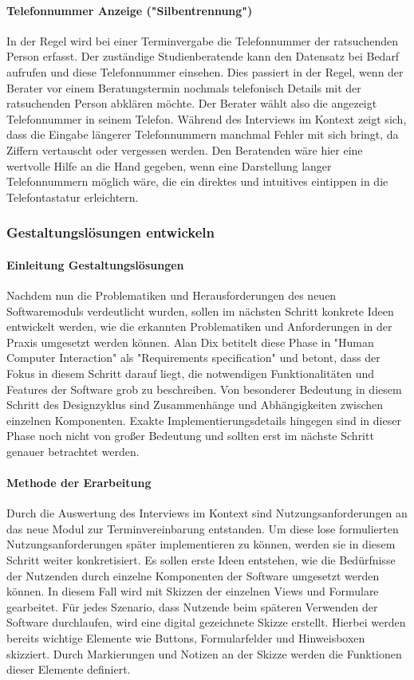 \documentclass[12pt]{article}
\begin{document}
\paragraph{Telefonnummer Anzeige ("Silbentrennung")}
In der Regel wird bei einer Terminvergabe die Telefonnummer der ratsuchenden
Person erfasst. Der zuständige Studienberatende kann den Datensatz bei Bedarf
aufrufen und diese Telefonnummer einsehen. Dies passiert in der Regel, wenn der
Berater vor einem Beratungstermin nochmals telefonisch Details mit der
ratsuchenden Person abklären möchte. Der Berater wählt also die angezeigt
Telefonnummer in seinem Telefon. Während des Interviews im Kontext zeigt sich,
dass die Eingabe längerer Telefonnummern manchmal Fehler mit sich bringt, da
Ziffern vertauscht oder vergessen werden. Den Beratenden wäre hier eine
wertvolle Hilfe an die Hand gegeben, wenn eine Darstellung langer
Telefonnummern möglich wäre, die ein direktes und intuitives eintippen in die
Telefontastatur erleichtern.

\subsubsection{Gestaltungslösungen entwickeln}

\paragraph{Einleitung Gestaltungslösungen}
Nachdem nun die Problematiken und Herausforderungen des neuen Softwaremoduls
verdeutlicht wurden, sollen im nächsten Schritt konkrete Ideen entwickelt
werden, wie die erkannten Problematiken und Anforderungen in der Praxis
umgesetzt werden können. Alan Dix betitelt diese Phase in "Human Computer
Interaction" als "Requirements specification" und betont, dass der Fokus in
diesem Schritt darauf liegt, die notwendigen Funktionalitäten und Features der
Software grob zu beschreiben. Von besonderer Bedeutung in diesem Schritt des
Designzyklus sind Zusammenhänge und Abhängigkeiten zwischen einzelnen
Komponenten. Exakte Implementierungsdetails hingegen sind in dieser Phase noch
nicht von großer Bedeutung und sollten erst im nächste Schritt genauer
betrachtet werden.

\paragraph{Methode der Erarbeitung}
Durch die Auswertung des Interviews im Kontext sind Nutzungsanforderungen an
das neue Modul zur Terminvereinbarung entstanden. Um diese lose formulierten
Nutzungsanforderungen später implementieren zu können, werden sie in diesem
Schritt weiter konkretisiert. Es sollen erste Ideen entstehen, wie die
Bedürfnisse der Nutzenden durch einzelne Komponenten der Software umgesetzt
werden können. In diesem Fall wird mit Skizzen der einzelnen Views und
Formulare gearbeitet. Für jedes Szenario, dass Nutzende beim späteren Verwenden
der Software durchlaufen, wird eine digital gezeichnete Skizze erstellt.
Hierbei werden bereits wichtige Elemente wie Buttons, Formularfelder und
Hinweisboxen skizziert. Durch Markierungen und Notizen an der Skizze werden die
Funktionen dieser Elemente definiert.
\end{document}
